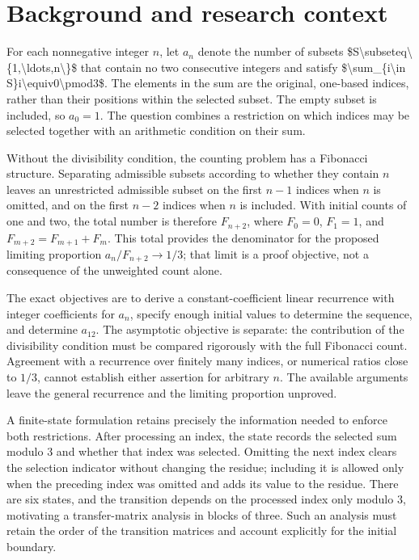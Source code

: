 \documentclass[11pt]{article}
\begin{document}
\section{Background and research context}
For each nonnegative integer $n$, let $a_n$ denote the number of subsets \$S\textbackslash{}subseteq\textbackslash{}\{1,\textbackslash{}ldots,n\textbackslash{}\}\$ that contain no two consecutive integers and satisfy \$\textbackslash{}sum\_\{i\textbackslash{}in S\}i\textbackslash{}equiv0\textbackslash{}pmod3\$. The elements in the sum are the original, one-based indices, rather than their positions within the selected subset. The empty subset is included, so $a_0=1$. The question combines a restriction on which indices may be selected together with an arithmetic condition on their sum.

Without the divisibility condition, the counting problem has a Fibonacci structure. Separating admissible subsets according to whether they contain $n$ leaves an unrestricted admissible subset on the first $n-1$ indices when $n$ is omitted, and on the first $n-2$ indices when $n$ is included. With initial counts of one and two, the total number is therefore $F_{n+2}$, where $F_0=0$, $F_1=1$, and $F_{m+2}=F_{m+1}+F_m$. This total provides the denominator for the proposed limiting proportion $a_n/F_{n+2}\to1/3$; that limit is a proof objective, not a consequence of the unweighted count alone.

The exact objectives are to derive a constant-coefficient linear recurrence with integer coefficients for $a_n$, specify enough initial values to determine the sequence, and determine $a_{12}$. The asymptotic objective is separate: the contribution of the divisibility condition must be compared rigorously with the full Fibonacci count. Agreement with a recurrence over finitely many indices, or numerical ratios close to $1/3$, cannot establish either assertion for arbitrary $n$. The available arguments leave the general recurrence and the limiting proportion unproved.

A finite-state formulation retains precisely the information needed to enforce both restrictions. After processing an index, the state records the selected sum modulo $3$ and whether that index was selected. Omitting the next index clears the selection indicator without changing the residue; including it is allowed only when the preceding index was omitted and adds its value to the residue. There are six states, and the transition depends on the processed index only modulo $3$, motivating a transfer-matrix analysis in blocks of three. Such an analysis must retain the order of the transition matrices and account explicitly for the initial boundary.
\end{document}

